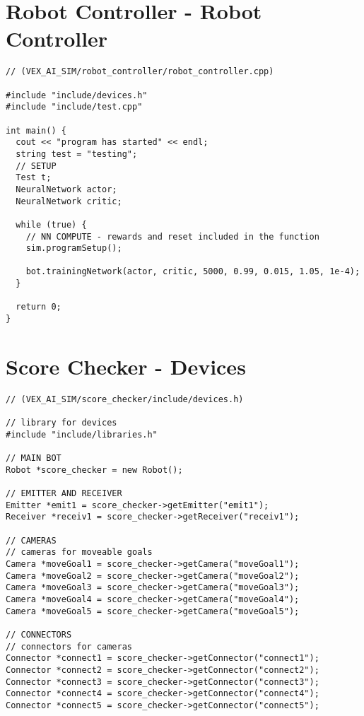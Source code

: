 \section*{Robot Controller - Robot Controller}
\begin{verbatim}
// (VEX_AI_SIM/robot_controller/robot_controller.cpp)
 
#include "include/devices.h"
#include "include/test.cpp"
 
int main() {
  cout << "program has started" << endl;
  string test = "testing";
  // SETUP
  Test t;
  NeuralNetwork actor;
  NeuralNetwork critic;
 
  while (true) {
    // NN COMPUTE - rewards and reset included in the function
    sim.programSetup();
 
    bot.trainingNetwork(actor, critic, 5000, 0.99, 0.015, 1.05, 1e-4);
  }
 
  return 0;
}
\end{verbatim}
\section*{Score Checker - Devices}
\begin{verbatim}
// (VEX_AI_SIM/score_checker/include/devices.h)
 
// library for devices
#include "include/libraries.h"
 
// MAIN BOT
Robot *score_checker = new Robot();
 
// EMITTER AND RECEIVER
Emitter *emit1 = score_checker->getEmitter("emit1");
Receiver *receiv1 = score_checker->getReceiver("receiv1");
 
// CAMERAS
// cameras for moveable goals
Camera *moveGoal1 = score_checker->getCamera("moveGoal1");
Camera *moveGoal2 = score_checker->getCamera("moveGoal2");
Camera *moveGoal3 = score_checker->getCamera("moveGoal3");
Camera *moveGoal4 = score_checker->getCamera("moveGoal4");
Camera *moveGoal5 = score_checker->getCamera("moveGoal5");
 
// CONNECTORS
// connectors for cameras
Connector *connect1 = score_checker->getConnector("connect1");
Connector *connect2 = score_checker->getConnector("connect2");
Connector *connect3 = score_checker->getConnector("connect3");
Connector *connect4 = score_checker->getConnector("connect4");
Connector *connect5 = score_checker->getConnector("connect5");
\end{verbatim}
